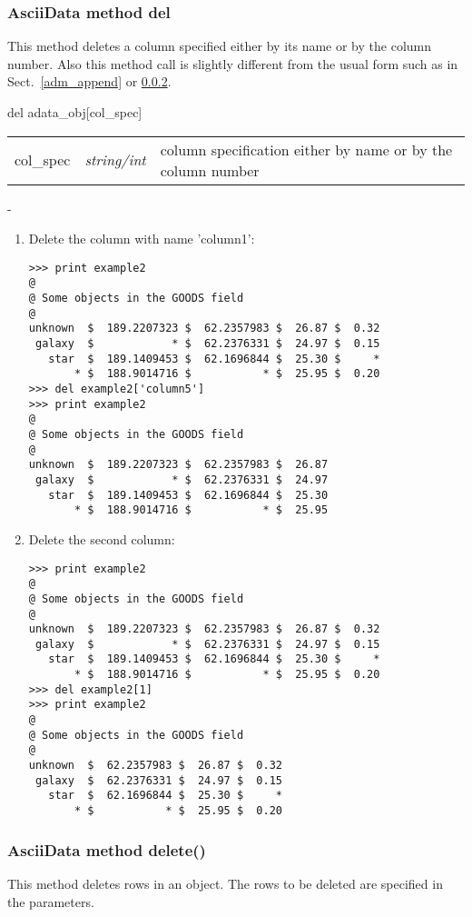 \subsubsection{AsciiData method del}
\label{adm_del}
This method deletes a column specified either by its name or
by the column number. Also this method call is slightly
different from the usual form such as in Sect.\ \ref{adm_append}
or \ref{adm_delete}.

del adata\_obj[col\_spec]

\begin{tabular}{lcl}
col\_spec &{\it string/int}& column specification either by name or by
the column number\\
\end{tabular}

-

\begin{enumerate}
\item Delete the column with name 'column1':
\begin{verbatim}
>>> print example2
@
@ Some objects in the GOODS field
@
unknown  $  189.2207323 $  62.2357983 $  26.87 $  0.32
 galaxy  $            * $  62.2376331 $  24.97 $  0.15
   star  $  189.1409453 $  62.1696844 $  25.30 $     *
       * $  188.9014716 $           * $  25.95 $  0.20
>>> del example2['column5']
>>> print example2
@
@ Some objects in the GOODS field
@
unknown  $  189.2207323 $  62.2357983 $  26.87
 galaxy  $            * $  62.2376331 $  24.97
   star  $  189.1409453 $  62.1696844 $  25.30
       * $  188.9014716 $           * $  25.95
\end{verbatim}
\item Delete the second column:
\begin{verbatim}
>>> print example2
@
@ Some objects in the GOODS field
@
unknown  $  189.2207323 $  62.2357983 $  26.87 $  0.32
 galaxy  $            * $  62.2376331 $  24.97 $  0.15
   star  $  189.1409453 $  62.1696844 $  25.30 $     *
       * $  188.9014716 $           * $  25.95 $  0.20
>>> del example2[1]
>>> print example2
@
@ Some objects in the GOODS field
@
unknown  $  62.2357983 $  26.87 $  0.32
 galaxy  $  62.2376331 $  24.97 $  0.15
   star  $  62.1696844 $  25.30 $     *
       * $           * $  25.95 $  0.20
\end{verbatim}
\end{enumerate}

\subsubsection{AsciiData method delete()}
\label{adm_delete}
This method deletes rows in an \ad object. The rows to be deleted
are specified in the parameters.


